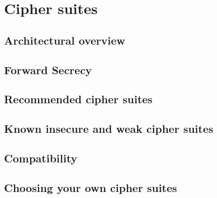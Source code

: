 \newpage

\section{Cipher suites}
\label{section:CipherSuites}


\subsection{Architectural overview }



\subsection{Forward Secrecy}



\subsection{Recommended cipher suites}



\subsection{Known insecure and weak cipher suites}



\subsection{Compatibility}



\subsection{Choosing your own cipher suites}


